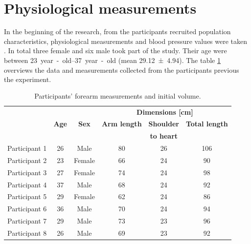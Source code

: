 

\section{Physiological measurements}
\label{section5.1}
In the beginning of the research, from the participants recruited population characteristics, physiological measurements and blood pressure values were taken . In total three female and six male took part of the study. Their age were between \SIrange{23}{37}{year-old} (mean \num{29.12(494)}). The table \ref{tbl:physiological} overviews the data and measurements collected from the participants previous the experiment.

\begin{table}[htbp] %
	\caption{Participants' forearm measurements and initial volume.}
	\label{tbl:physiological}
	\centering
	\begin{tabular}{lcc|ccc}
		\toprule
		&              &              &         \multicolumn{3}{c}{\textbf{Dimensions [\si{\cm}]}}         \\
		& \textbf{Age} & \textbf{Sex} & \textbf{Arm length} & \textbf{Shoulder} & \textbf{Total length} \\
		&              &              &                     &  \textbf{to heart}   &                       \\ \midrule
		Participant 1 &      26      &     Male     &         80          &          26          &          106          \\
		Participant 2 &      23      &    Female    &         66          &          24          &          90           \\
		Participant 3 &      27      &    Female    &         74          &          24          &          98           \\
		Participant 4 &      37      &     Male     &         68          &          24          &          92           \\
		Participant 5 &      29      &    Female    &         62          &          24          &          86           \\
		Participant 6 &      36      &     Male     &         70          &          24          &          94           \\
		Participant 7 &      29      &     Male     &         73          &          23          &          96           \\
		Participant 8 &      26      &     Male     &         69          &          23          &          92           \\ \bottomrule
	\end{tabular}
\end{table}

